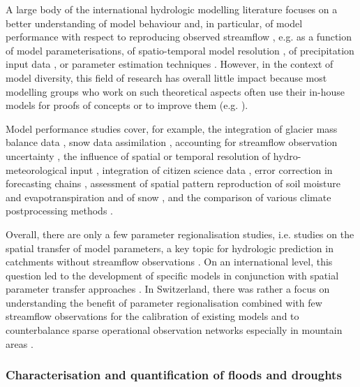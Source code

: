 \documentclass[10pt,a4paper]{article}
\begin{document}
A large body of the international hydrologic modelling literature focuses on a better understanding of model behaviour and, in particular, of model performance with respect to reproducing observed streamflow \citep{Clark2011a, Beven2011}, e.g. as a function of model parameterisations, of spatio-temporal model resolution \citep{Brunner2019}, of precipitation input data \citep{Sikorska2016, Sikorska2017, MullerThomy2019}, or parameter estimation techniques \citep{Foglia2009, Cullmann2011}. However, in the context of model diversity, this field of research has overall little impact because most modelling groups who work on such theoretical aspects often use their in-house models for proofs of concepts or to improve them (e.g. \citealt{Schaefli2007, Hingray2010}).

Model performance studies cover, for example, the integration of glacier mass balance data \citep{Finger2015, Schaefli2011}, snow data assimilation \citep{Griessinger2016}, accounting for streamflow observation uncertainty \citep{Westerberg2020}, the influence of spatial or temporal resolution of hydro-meteorological input \citep{GironsLopez2016, Felder2017, Sikorska2018}, integration of citizen science data \citep{Etter2020}, error correction in forecasting chains \citep{Bogner2018}, assessment of spatial pattern reproduction of soil moisture and evapotranspiration \citep{Rossler2010, Zappa2003} and of snow \citep{Zappa2008a}, and the comparison of various climate postprocessing methods \citep{Rossler2019}.

Overall, there are only a few parameter regionalisation studies, i.e. studies on the spatial transfer of model parameters, a key topic for hydrologic prediction in catchments without streamflow observations \citep{Guo2021}. On an international level, this question led to the development of specific models in conjunction with spatial parameter transfer approaches \citep[e.g., mHM;][]{Samaniego2010a}. In Switzerland, there was rather a focus on understanding the benefit of parameter regionalisation combined with few streamflow observations for the calibration of existing models and to counterbalance sparse operational observation networks especially in mountain areas \citep{Viviroli2015}.


\subsubsection{Characterisation and quantification of floods and droughts}
\label{sec:context:floodsdroughts}
\end{document}
